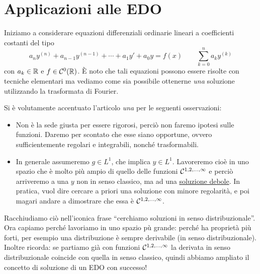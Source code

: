 \newpage

\section{Applicazioni alle EDO}
Iniziamo a considerare equazioni differenziali ordinarie lineari a coefficienti costanti del tipo
\begin{equation*}
a_ny^{(n)}+a_{n-1}y^{(n-1)}+\cdots+a_1y'+a_0y=f(x)\qquad \boxed{\sum_{k=0}^n a_ky^{(k)}}
\end{equation*}
con $a_k\in\mathbb{R}$ e $f\in\mathcal{C}^0(\mathbb{R})$. È noto che tali equazioni possono essere risolte con tecniche elementari ma vediamo come sia possibile ottenerne \textit{una} soluzione utilizzando la trasformata di Fourier. 

Si è volutamente accentuato l'articolo \textit{una} per le seguenti osservazioni:
\begin{itemize}
    \item Non è la sede giusta per essere rigorosi, perciò non faremo ipotesi sulle funzioni. Daremo per scontato che esse siano opportune, ovvero sufficientemente regolari e integrabili, nonché trasformabili.
    \item In generale assumeremo $g\in L^1$, che implica $y\in L^1$. Lavoreremo cioè in uno spazio che è molto più ampio di quello delle funzioni $\mathcal{C}^{1,2,\dots,\infty}$ e perciò arriveremo a una $y$ non in senso classico, ma ad una \underline{soluzione debole}. In pratica, vuol dire cercare a priori una soluzione con minore regolarità, e poi magari andare a dimostrare che essa è $\mathcal{C}^{1,2,\dots,\infty}$.
\end{itemize}
Racchiudiamo ciò nell'iconica frase ``cerchiamo soluzioni in senso distribuzionale''. Ora capiamo perché lavoriamo in uno spazio pù grande: perché ha proprietà più forti, per esempio una distribuzione è sempre derivabile (in senso distribuzionale). Inoltre ricorda: se partiamo già con funzioni $\mathcal{C}^{1,2,\dots,\infty}$ la derivata in senso distribuzionale coincide con quella in senso classico, quindi abbiamo ampliato il concetto di soluzione di un EDO con successo! 

